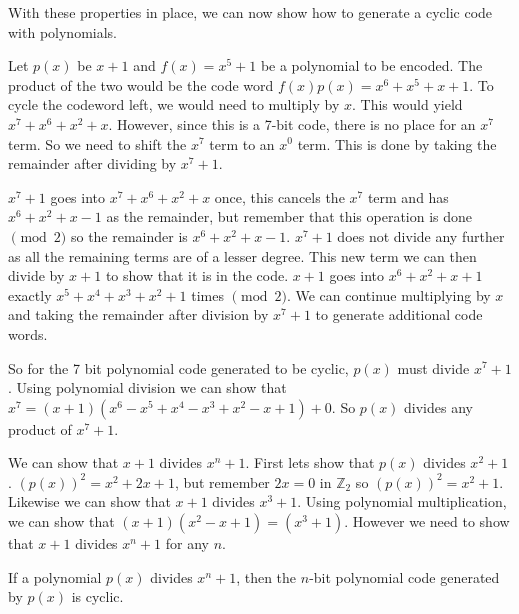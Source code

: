 
With these properties in place, we can now show how to generate a cyclic code with polynomials.  

\begin{example}{}
Let $p(x)$ be $x+1$ and $f(x) = x^5 + 1$ be a polynomial to be encoded.  The product of the two would be the code word $f(x)p(x) = x^6 + x^5 + x + 1$.  To cycle the codeword left, we would need to multiply by $x$. This would yield $x^7 + x^6 + x^2 + x$.  However, since this is a 7-bit code, there is no place for an $x^7$ term.  So we need to shift the $x^7$ term to an $x^0$ term.  This is done by 
taking the remainder after dividing by $x^7+1$.  

$x^7 + 1$ goes into $x^7 + x^6 + x^2 + x$ once, this cancels the $x^7$ term and has $x^6 + x^2 + x - 1$ as the remainder, but remember that this operation is done $\pmod 2$ so the remainder is $x^6 + x^2 + x - 1$.  $x^7 + 1$ does not divide any further as all the remaining terms are of a lesser degree.  
This new term we can then divide by $x+1$ to show that it is in the code.  $x+1$ goes into $x^6 + x^2 + x + 1$ exactly $x^5 + x^4 + x^3 + x^2 + 1$ times $\pmod2$.  We can continue multiplying by $x$ and taking the remainder after division by $x^7 + 1$ to generate additional code words.

So for the 7 bit polynomial code generated to be cyclic, $p(x)$ must divide $x^7 + 1$.  Using polynomial division we can show that $x^7 = (x+1)(x^6-x^5+x^4-x^3+x^2-x+1) + 0$.  So $p(x)$ divides any product of $x^7+1$.

We can show that $x+1$ divides $x^n + 1$.  First lets show that $p(x)$ divides $x^2 + 1$.  $(p(x))^2 = x^2 + 2x + 1$, but remember $2x = 0$ in $\mathbb{Z}_2$ so $(p(x))^2 = x^2 + 1$. Likewise we can show that $x+1$ divides $x^3 + 1$.  Using polynomial multiplication, we can show that $(x+1)(x^2 -x + 1) = (x^3 + 1)$.  However we need to show that $x+1$ divides $x^n+1$ for any $n$.
\end {example}

\begin{prop}{}
If a polynomial $p(x)$ divides $x^n + 1$, then the $n$-bit polynomial code generated by $p(x)$ is cyclic.
\end {prop}


